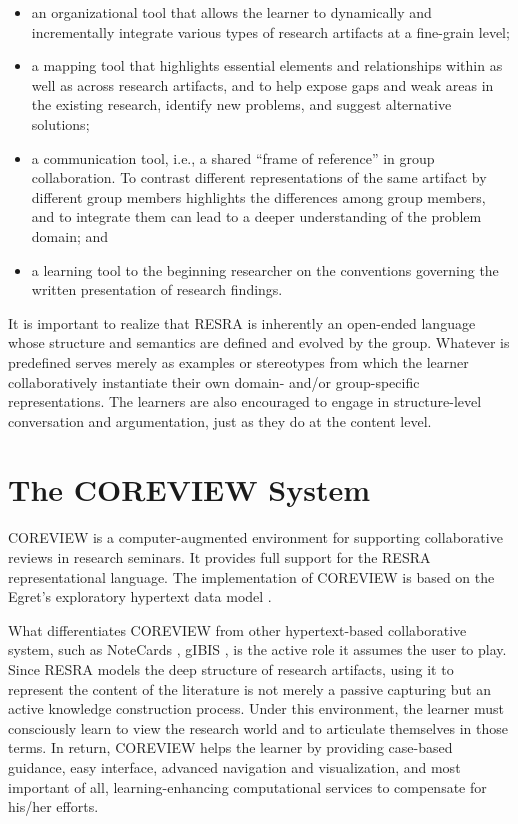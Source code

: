 \begin{itemize}
  
\item an organizational tool that allows the learner to dynamically and
  incrementally integrate various types of research artifacts at a fine-grain
  level;
  
\item a mapping tool that highlights essential elements and relationships
  within as well as across research artifacts, and to help expose gaps and
  weak areas in the existing research, identify new problems, and suggest
  alternative solutions;
  
\item a communication tool, i.e., a shared ``frame of reference'' in
  group collaboration. To contrast different representations of the same
  artifact by different group members highlights the differences among
  group members, and to integrate them can lead to a deeper understanding
  of the problem domain; and
  
\item a learning tool to the beginning researcher on the conventions
  governing the written presentation of research findings.
  
\end{itemize}

It is important to realize that RESRA is inherently an open-ended language
whose structure and semantics are defined and evolved by the group.
Whatever is predefined serves merely as examples or stereotypes from which
the learner collaboratively instantiate their own domain- and/or
group-specific representations. The learners are also encouraged to engage
in structure-level conversation and argumentation, just as they do at the
content level.


\section{The COREVIEW System}

COREVIEW is a computer-augmented environment for supporting collaborative
reviews in research seminars. It provides full support for the RESRA
representational language. The implementation of COREVIEW is based on the
Egret's exploratory hypertext data model \cite{csdl-92-01}.

What differentiates COREVIEW from other hypertext-based collaborative
system, such as NoteCards \cite{Halasz87Notecards}, gIBIS \cite{Conklin88},
is the active role it assumes the user to play. Since RESRA models the deep
structure of research artifacts, using it to represent the content of the
literature is not merely a passive capturing but an active knowledge
construction process. Under this environment, the learner must consciously
learn to view the research world and to articulate themselves in those
terms. In return, COREVIEW helps the learner by providing case-based
guidance, easy interface, advanced navigation and visualization, and most
important of all, learning-enhancing computational services to compensate
for his/her efforts.


